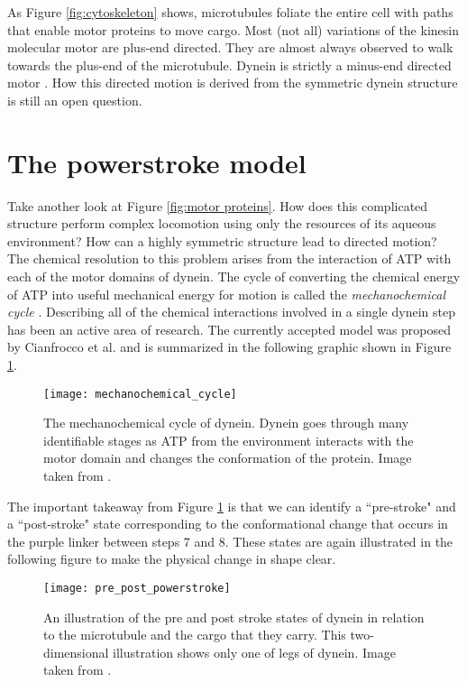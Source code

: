 As Figure \ref{fig:cytoskeleton} shows, microtubules foliate the entire cell with paths that enable motor proteins to move cargo. Most (not all) variations of the kinesin molecular motor are plus-end directed. They are almost always observed to walk towards the plus-end of the microtubule. Dynein is strictly a minus-end directed motor \cite{alberts2002molecular}. How this directed motion is derived from the symmetric dynein structure is still an open question.\\



\section{The powerstroke model} 
Take another look at Figure \ref{fig:motor proteins}. How does this complicated structure perform complex locomotion using only the resources of its aqueous environment? How can a highly symmetric structure lead to directed motion? The chemical resolution to this problem arises from the interaction of ATP with each of the motor domains of dynein. The cycle of converting the chemical energy of  ATP into useful mechanical energy for motion is called the \textit{mechanochemical cycle} \cite{cianfrocco2015mechanism}. Describing all of the chemical interactions involved in a single dynein step has been an active area of research. The currently accepted model was proposed by Cianfrocco et al. and is summarized in the following graphic shown in Figure \ref{fig:mechanochemical_cycle}. 

\begin{figure}[!hbt]
	\centering
	\texttt{[image: mechanochemical\_cycle]}
	\caption[Cianfrocco's mechanochemical cycle]{The mechanochemical cycle of dynein. Dynein goes through many identifiable stages as ATP from the environment interacts with the motor domain and changes the conformation of the protein. Image taken from \cite{cianfrocco2015mechanism}.}
	\label{fig:mechanochemical_cycle}
\end{figure}

The important takeaway from Figure \ref{fig:mechanochemical_cycle} is that we can identify a ``pre-stroke" and a ``post-stroke" state corresponding to the conformational change that occurs in the purple linker between steps 7 and 8. These states are again illustrated in the following figure to make the physical change in shape clear. 

\begin{figure}[!hbt]
	\centering
	\texttt{[image: pre\_post\_powerstroke]}
	\caption[Powerstroke illustration]{An illustration of the pre and post stroke states of dynein in relation to the microtubule and the cargo that they carry. This two-dimensional illustration shows only one of legs of dynein. Image taken from \cite{lin2014structural}.}
\end{figure}

